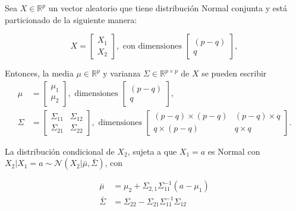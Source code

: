 \begin{prop}
    Sea $X \in \mathbb{R}^p$ un vector aleatorio que tiene distribuci\'on Normal conjunta y est\'a particionado de la siguiente manera:

    \begin{equation*}
        X = 
        \left[
        \begin{array}{c}
            X_1  \\
            X_2
        \end{array}
        \right], 
        \text{ con dimensiones }
            \left[
        \begin{array}{c}
            (p-q)  \\
            q
        \end{array}
        \right],
    \end{equation*}
    
    Entonces, la media $\mu \in \mathbb{R}^p$ y varianza $\Sigma \in \mathbb{R}^{p \times p}$ de $X$ se pueden escribir
    \begin{equation*}
    \begin{aligned}
        \mu &= 
        \left[
        \begin{array}{c}
            \mu_1  \\
            \mu_2
        \end{array}
        \right], 
        \text{ dimensiones }
            \left[
        \begin{array}{c}
            (p-q)  \\
            q
        \end{array}
        \right], \\
        \Sigma &= 
        \left[
        \begin{array}{cc}
            \Sigma_{11} & \Sigma_{12}  \\
            \Sigma_{21} & \Sigma_{22}
        \end{array}
        \right], 
        \text{ dimensiones }
            \left[
        \begin{array}{cc}
            (p-q) \times (p-q)  & (p-q) \times q  \\
            q \times (p-q) & q \times q
        \end{array}
        \right].
    \end{aligned}
    \end{equation*}
    
    La distribuci\'on condicional de $X_2$, sujeta a que $X_1 = a$ es Normal con $X_2|X_1=a \sim \mathcal{N}(X_2|\bar{\mu},\bar{\Sigma})$, con
    
    \begin{equation*}
    \begin{aligned}
        \bar{\mu} &= \mu_2 + \Sigma_{2,1}\Sigma_{11}^{-1}(a-\mu_1) \\
        \bar{\Sigma} &= \Sigma_{22} - \Sigma_{21}\Sigma_{11}^{-1}\Sigma_{12}
    \end{aligned}
    \end{equation*}
\end{prop}

